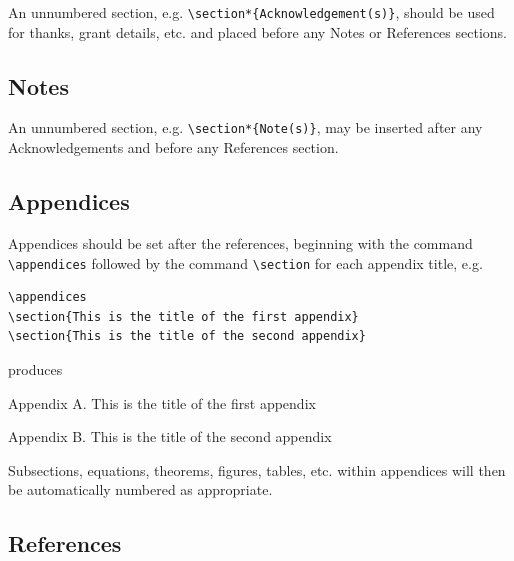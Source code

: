 \documentclass[]{tMAM2e}
\begin{document}
An unnumbered section, e.g. \verb"\section*{Acknowledgement(s)}", should be used for thanks, grant details, etc.
and placed before any Notes or References sections.
\subsection{Notes}

An unnumbered section, e.g. \verb"\section*{Note(s)}", may be inserted after any Acknowledgements and before any References section.
\subsection{Appendices}

Appendices should be set after the references, beginning with the
command \verb"\appendices" followed by the command \verb"\section"
for each appendix title, e.g.
%
\begin{verbatim}
\appendices
\section{This is the title of the first appendix}
\section{This is the title of the second appendix}
\end{verbatim}

\noindent produces\medskip

\noindent Appendix A. This is the title of the first appendix

\noindent Appendix B. This is the title of the second appendix

\medskip
Subsections, equations, theorems, figures, tables, etc. within
appendices will then be automatically numbered as appropriate.
\subsection{References}\label{refs}
\end{document}
